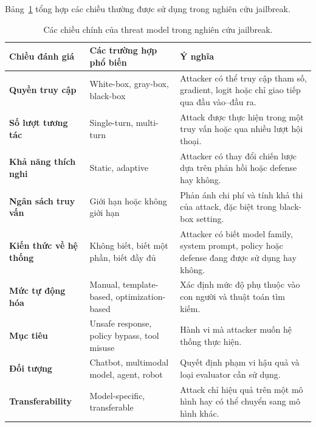 Bảng~\ref{tab:jailbreak-threat-model-dimensions} tổng hợp các chiều thường
được sử dụng trong nghiên cứu jailbreak.

\begin{table}[H]
\centering
\caption{Các chiều chính của threat model trong nghiên cứu jailbreak.}
\label{tab:jailbreak-threat-model-dimensions}
\begin{tabularx}{\textwidth}{
    >{\bfseries}p{}
    p{}
    X
}
\toprule
Chiều đánh giá
& Các trường hợp phổ biến
& Ý nghĩa \\
\midrule

Quyền truy cập
& White-box, gray-box, black-box
& Attacker có thể truy cập tham số, gradient, logit hoặc chỉ giao tiếp
qua đầu vào--đầu ra. \\

Số lượt tương tác
& Single-turn, multi-turn
& Attack được thực hiện trong một truy vấn hoặc qua nhiều lượt hội thoại. \\

Khả năng thích nghi
& Static, adaptive
& Attacker có thay đổi chiến lược dựa trên phản hồi hoặc defense hay không. \\

Ngân sách truy vấn
& Giới hạn hoặc không giới hạn
& Phản ánh chi phí và tính khả thi của attack, đặc biệt trong black-box
setting. \\

Kiến thức về hệ thống
& Không biết, biết một phần, biết đầy đủ
& Attacker có biết model family, system prompt, policy hoặc defense đang
được sử dụng hay không. \\

Mức tự động hóa
& Manual, template-based, optimization-based
& Xác định mức độ phụ thuộc vào con người và thuật toán tìm kiếm. \\

Mục tiêu
& Unsafe response, policy bypass, tool misuse
& Hành vi mà attacker muốn hệ thống thực hiện. \\

Đối tượng
& Chatbot, multimodal model, agent, robot
& Quyết định phạm vi hậu quả và loại evaluator cần sử dụng. \\

Transferability
& Model-specific, transferable
& Attack chỉ hiệu quả trên một mô hình hay có thể chuyển sang mô hình khác. \\

\bottomrule
\end{tabularx}
\end{table}

